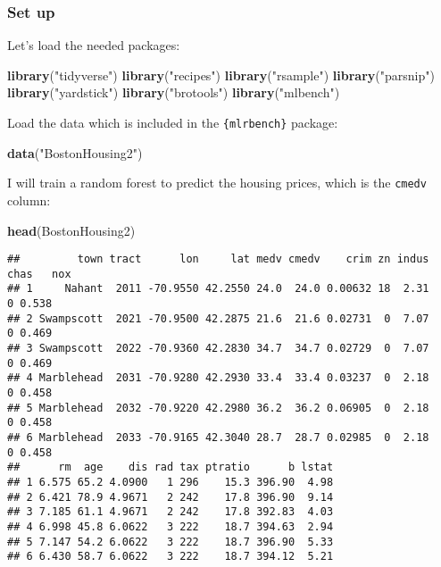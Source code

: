 \documentclass[
]{article}
\newenvironment{Shaded}{\begin{snugshade}}{\end{snugshade}}
\newcommand{\KeywordTok}[1]{\textcolor[rgb]{0.13,0.29,0.53}{\textbf{#1}}}
\newcommand{\NormalTok}[1]{#1}
\newcommand{\StringTok}[1]{\textcolor[rgb]{0.31,0.60,0.02}{#1}}
\begin{document}
\hypertarget{set-up}{%
\subsubsection{Set up}\label{set-up}}

Let's load the needed packages:

\begin{Shaded}
\begin{Highlighting}[]
\KeywordTok{library}\NormalTok{(}\StringTok{"tidyverse"}\NormalTok{)}
\KeywordTok{library}\NormalTok{(}\StringTok{"recipes"}\NormalTok{)}
\KeywordTok{library}\NormalTok{(}\StringTok{"rsample"}\NormalTok{)}
\KeywordTok{library}\NormalTok{(}\StringTok{"parsnip"}\NormalTok{)}
\KeywordTok{library}\NormalTok{(}\StringTok{"yardstick"}\NormalTok{)}
\KeywordTok{library}\NormalTok{(}\StringTok{"brotools"}\NormalTok{)}
\KeywordTok{library}\NormalTok{(}\StringTok{"mlbench"}\NormalTok{)}
\end{Highlighting}
\end{Shaded}

Load the data which is included in the \texttt{\{mlrbench\}} package:

\begin{Shaded}
\begin{Highlighting}[]
\KeywordTok{data}\NormalTok{(}\StringTok{"BostonHousing2"}\NormalTok{)}
\end{Highlighting}
\end{Shaded}

I will train a random forest to predict the housing prices, which is the \texttt{cmedv} column:

\begin{Shaded}
\begin{Highlighting}[]
\KeywordTok{head}\NormalTok{(BostonHousing2)}
\end{Highlighting}
\end{Shaded}

\begin{verbatim}
##         town tract      lon     lat medv cmedv    crim zn indus chas   nox
## 1     Nahant  2011 -70.9550 42.2550 24.0  24.0 0.00632 18  2.31    0 0.538
## 2 Swampscott  2021 -70.9500 42.2875 21.6  21.6 0.02731  0  7.07    0 0.469
## 3 Swampscott  2022 -70.9360 42.2830 34.7  34.7 0.02729  0  7.07    0 0.469
## 4 Marblehead  2031 -70.9280 42.2930 33.4  33.4 0.03237  0  2.18    0 0.458
## 5 Marblehead  2032 -70.9220 42.2980 36.2  36.2 0.06905  0  2.18    0 0.458
## 6 Marblehead  2033 -70.9165 42.3040 28.7  28.7 0.02985  0  2.18    0 0.458
##      rm  age    dis rad tax ptratio      b lstat
## 1 6.575 65.2 4.0900   1 296    15.3 396.90  4.98
## 2 6.421 78.9 4.9671   2 242    17.8 396.90  9.14
## 3 7.185 61.1 4.9671   2 242    17.8 392.83  4.03
## 4 6.998 45.8 6.0622   3 222    18.7 394.63  2.94
## 5 7.147 54.2 6.0622   3 222    18.7 396.90  5.33
## 6 6.430 58.7 6.0622   3 222    18.7 394.12  5.21
\end{verbatim}
\end{document}
